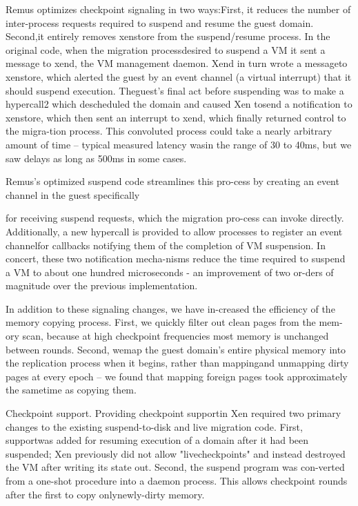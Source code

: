 Remus optimizes checkpoint signaling in two ways:First, it reduces the number of inter-process requests required to suspend and resume the guest domain. Second,it entirely removes xenstore from the suspend/resume
process. In the original code, when the migration processdesired to suspend a VM it sent a message to xend, the
VM management daemon. Xend in turn wrote a messageto xenstore, which alerted the guest by an event channel
(a virtual interrupt) that it should suspend execution. Theguest's final act before suspending was to make a hypercall2 which descheduled the domain and caused Xen tosend a notification to xenstore, which then sent an interrupt to xend, which finally returned control to the migra-tion process. This convoluted process could take a nearly
arbitrary amount of time -- typical measured latency wasin the range of 30 to 40ms, but we saw delays as long as
500ms in some cases.

Remus's optimized suspend code streamlines this pro-cess by creating an event channel in the guest specifically

for receiving suspend requests, which the migration pro-cess can invoke directly. Additionally, a new hypercall is
provided to allow processes to register an event channelfor callbacks notifying them of the completion of VM
suspension. In concert, these two notification mecha-nisms reduce the time required to suspend a VM to about
one hundred microseconds - an improvement of two or-ders of magnitude over the previous implementation.

In addition to these signaling changes, we have in-creased the efficiency of the memory copying process.
First, we quickly filter out clean pages from the mem-ory scan, because at high checkpoint frequencies most
memory is unchanged between rounds. Second, wemap the guest domain's entire physical memory into the
replication process when it begins, rather than mappingand unmapping dirty pages at every epoch -- we found
that mapping foreign pages took approximately the sametime as copying them.

Checkpoint support. Providing checkpoint supportin Xen required two primary changes to the existing
suspend-to-disk and live migration code. First, supportwas added for resuming execution of a domain after it
had been suspended; Xen previously did not allow "livecheckpoints" and instead destroyed the VM after writing its state out. Second, the suspend program was con-verted from a one-shot procedure into a daemon process.
This allows checkpoint rounds after the first to copy onlynewly-dirty memory.

